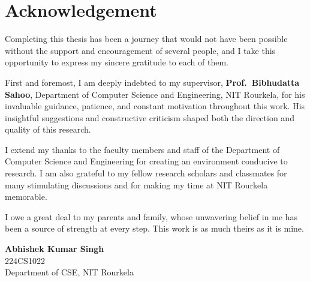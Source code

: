 \chapter*{Acknowledgement}
\thispagestyle{plain}


Completing this thesis has been a journey that would not have been
possible without the support and encouragement of several people, and
I take this opportunity to express my sincere gratitude to each of
them.

First and foremost, I am deeply indebted to my supervisor,
\textbf{Prof.\ Bibhudatta Sahoo}, Department of Computer Science and
Engineering, NIT Rourkela, for his invaluable guidance, patience, and
constant motivation throughout this work. His insightful suggestions
and constructive criticism shaped both the direction and quality of
this research.

I extend my thanks to the faculty members and staff of the Department
of Computer Science and Engineering for creating an environment
conducive to research. I am also grateful to my fellow research
scholars and classmates for many stimulating discussions and for making
my time at NIT Rourkela memorable.

I owe a great deal to my parents and family, whose unwavering belief
in me has been a source of strength at every step. This work is as
much theirs as it is mine.

\vspace{1.5cm}
\noindent
\begin{flushright}
\textbf{Abhishek Kumar Singh}\\
224CS1022\\
Department of CSE, NIT Rourkela
\end{flushright}
